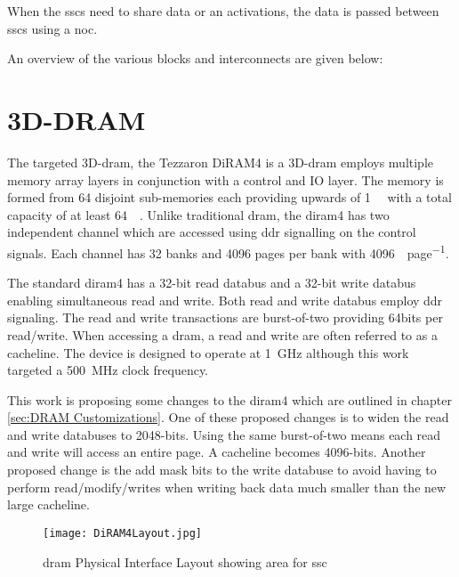 When the \acp{ssc} need to share data or \ac{an} activations, the data is passed between \acp{ssc} using a \ac{noc}.

An overview of the various blocks and interconnects are given below:

\section{3D-DRAM}
The targeted 3D-\ac{dram}, the Tezzaron DiRAM4 is a 3D-\ac{dram} employs multiple memory array layers in conjunction with a control and IO layer.
The memory is formed from 64 disjoint sub-memories each providing upwards of \SI[per-mode=symbol]{1}{\giga\bit} with a total capacity of at least \SI[per-mode=symbol]{64}{\giga\bit}.
Unlike traditional \ac{dram}, the \ac{diram4} has two independent channel which are accessed using \ac{ddr} signalling on the control signals.
Each channel has 32 banks and 4096 pages per bank with \SI[per-mode=symbol]{4096}{\bit\per page}.

The standard \ac{diram4} has a 32-bit read databus and a 32-bit write databus enabling simultaneous read and write. Both read and write databus employ \ac{ddr} signaling.
The read and write transactions are burst-of-two providing 64bits per read/write. When accessing a \ac{dram}, a read and write are often referred to as a cacheline.
The device is designed to operate at \SI[per-mode=symbol]{1}{\giga\hertz} although this work targeted a \SI[per-mode=symbol]{500}{\mega\hertz} clock frequency.

This work is proposing some changes to the \ac{diram4} which are outlined in chapter \ref{sec:DRAM Customizations}. One of these proposed changes is to widen the read and write databuses to 2048-bits.
Using the same burst-of-two means each read and write will access an entire page. A cacheline becomes 4096-bits.
Another proposed change is the add mask bits to the write databuse to avoid having to perform read/modify/writes when writing back data much smaller than the new large cacheline.

\begin{figure}[!t]
\centering
\captionsetup{justification=centering}
\captionsetup{width=.9\linewidth}
\centerline{
\mbox{\texttt{[image: DiRAM4Layout.jpg]}}
}
\caption{\ac{dram} Physical Interface Layout showing area for \ac{ssc}}
\label{fig:diram4Layout}
\end{figure}


